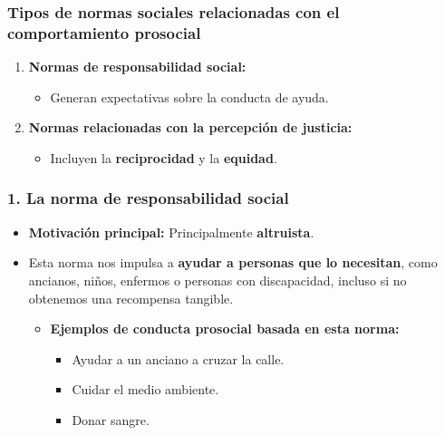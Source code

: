 \documentclass[
]{book}
\providecommand{\tightlist}{%
  \setlength{\itemsep}{0pt}\setlength{\parskip}{0pt}}
\begin{document}
\subsubsection{Tipos de normas sociales relacionadas con el comportamiento prosocial}\label{tipos-de-normas-sociales-relacionadas-con-el-comportamiento-prosocial}

\begin{enumerate}
\def\labelenumi{\arabic{enumi}.}
\tightlist
\item
  \textbf{Normas de responsabilidad social:}

  \begin{itemize}
  \tightlist
  \item
    Generan expectativas sobre la conducta de ayuda.
  \end{itemize}
\item
  \textbf{Normas relacionadas con la percepción de justicia:}

  \begin{itemize}
  \tightlist
  \item
    Incluyen la \textbf{reciprocidad} y la \textbf{equidad}.
  \end{itemize}
\end{enumerate}

\subsubsection{1. La norma de responsabilidad social}\label{la-norma-de-responsabilidad-social}

\begin{itemize}
\tightlist
\item
  \textbf{Motivación principal:} Principalmente \textbf{altruista}.
\item
  Esta norma nos impulsa a \textbf{ayudar a personas que lo necesitan}, como ancianos, niños, enfermos o personas con discapacidad, incluso si no obtenemos una recompensa tangible.

  \begin{itemize}
  \tightlist
  \item
    \textbf{Ejemplos de conducta prosocial basada en esta norma:}

    \begin{itemize}
    \tightlist
    \item
      Ayudar a un anciano a cruzar la calle.\\
    \item
      Cuidar el medio ambiente.\\
    \item
      Donar sangre.
    \end{itemize}
  \end{itemize}
\end{itemize}
\end{document}
